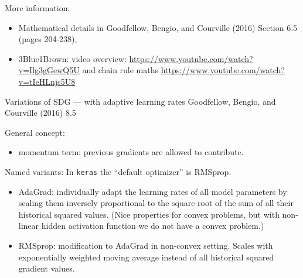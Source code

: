 \documentclass[
  ignorenonframetext,
]{beamer}
\providecommand{\tightlist}{%
  \setlength{\itemsep}{0pt}\setlength{\parskip}{0pt}}
\begin{document}
\begin{frame}
More information:

\begin{itemize}
\tightlist
\item
  Mathematical details in Goodfellow, Bengio, and Courville (2016)
  Section 6.5 (pages 204-238),
\item
  3Blue1Brown: video overview:
  \url{https://www.youtube.com/watch?v=Ilg3gGewQ5U} and chain rule maths
  \url{https://www.youtube.com/watch?v=tIeHLnjs5U8}
\end{itemize}
\end{frame}

\begin{frame}[fragile]
\begin{block}{Variations of SDG --- with adaptive learning rates}
\protect\hypertarget{variations-of-sdg-with-adaptive-learning-rates}{}
Goodfellow, Bengio, and Courville (2016) 8.5

General concept:

\begin{itemize}
\tightlist
\item
  momentum term: previous gradients are allowed to contribute.
\end{itemize}

Named variants: In \texttt{keras} the ``default optimizer'' is RMSprop.

\begin{itemize}
\tightlist
\item
  AdaGrad: individually adapt the learning rates of all model parameters
  by scaling them inversely proportional to the square root of the sum
  of all their historical squared values. (Nice properties for convex
  problems, but with non-linear hidden activation function we do not
  have a convex problem.)
\item
  RMSprop: modification to AdaGrad in non-convex setting. Scales with
  exponentially weighted moving average instead of all historical
  squared gradient values.
\end{itemize}
\end{block}
\end{frame}
\end{document}
